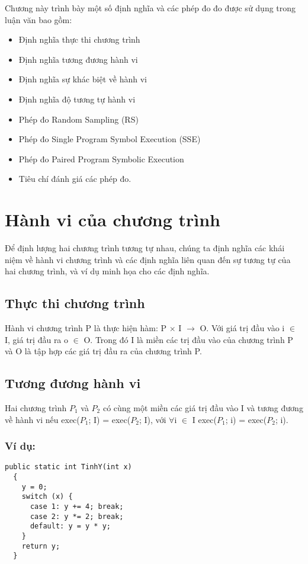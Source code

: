 Chương này trình bày một số định nghĩa và các phép đo đo được sử dụng trong luận văn bao gồm:
\begin{itemize}	
	\item Định nghĩa thực thi chương trình
	\item Định nghĩa tương đương hành vi
	\item Định nghĩa sự khác biệt về hành vi
	\item Định nghĩa độ tương tự hành vi
	\item Phép đo Random Sampling (RS)
	\item Phép đo Single Program Symbol Execution (SSE)
	\item Phép đo Paired Program Symbolic Execution
	\item Tiêu chí đánh giá các phép đo.
\end{itemize}

\section{Hành vi của chương trình}
Để định lượng hai chương trình tương tự nhau, chúng ta định nghĩa các khái niệm về hành vi chương trình và các định nghĩa liên quan đến sự tương tự của hai chương trình, và ví dụ minh họa cho các định nghĩa. 
	
\subsection{Thực thi chương trình}
\begin{definition}\label{def:progexe}
Hành vi chương trình P là thực hiện hàm: P $\times$ I $\rightarrow$ O. Với giá trị đầu vào i $\in$ I, giá trị đầu ra o $\in$ O. Trong đó I là miền các trị đầu vào của chương trình P và O là tập hợp các giá trị đầu ra của chương trình P.  
\end{definition}

\subsection{Tương đương hành vi}
\begin{definition}
  Hai chương trình $P_{1}$ và $P_{2}$ có cùng một miền các giá trị đầu
  vào I và tương đương về hành vi nếu exec($P_{1}$; I) = exec($P_{2}$;
  I), với $\forall$i $\in$ I exec($P_{1}$; i) = exec($P_{2}$; i).
\end{definition}
	
\subsubsection{Ví dụ:}
\begin{lstlisting}[language={[Sharp]C}, caption={Tính y, sử dụng hàm switch...case}, label={Script}]
  public static int TinhY(int x)
  {
    y = 0;
    switch (x) {
      case 1: y += 4; break;
      case 2: y *= 2; break;
      default: y = y * y;
    }
    return y;
  }
\end{lstlisting}


